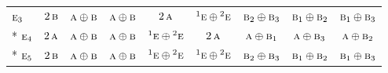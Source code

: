 \documentclass[10pt,a4paper]{article}
\numberwithin{equation}{section}
\newcommand{\irr}[1]{\text{\normalfont\scshape #1}}
\newcommand{\conjpair}[1]{{}^{#1}}
\begin{document}
{\begin{longtable}{@{}lcccccccc@{}}
$\irr{e}_{3}$ & $2\,\irr{b}$ & $\irr{a}\oplus \irr{b}$ & $\irr{a}\oplus \irr{b}$ & $2\,\irr{a}$ & $\conjpair{1}\irr{e}\oplus \conjpair{2}\irr{e}$ & $\irr{b}_{2}\oplus \irr{b}_{3}$ & $\irr{b}_{1}\oplus \irr{b}_{2}$ & $\irr{b}_{1}\oplus \irr{b}_{3}$\\*
$\irr{e}_{4}$ & $2\,\irr{a}$ & $\irr{a}\oplus \irr{b}$ & $\irr{a}\oplus \irr{b}$ & $\conjpair{1}\irr{e}\oplus \conjpair{2}\irr{e}$ & $2\,\irr{a}$ & $\irr{a}\oplus \irr{b}_{1}$ & $\irr{a}\oplus \irr{b}_{3}$ & $\irr{a}\oplus \irr{b}_{2}$\\*
$\irr{e}_{5}$ & $2\,\irr{b}$ & $\irr{a}\oplus \irr{b}$ & $\irr{a}\oplus \irr{b}$ & $\conjpair{1}\irr{e}\oplus \conjpair{2}\irr{e}$ & $\conjpair{1}\irr{e}\oplus \conjpair{2}\irr{e}$ & $\irr{b}_{2}\oplus \irr{b}_{3}$ & $\irr{b}_{1}\oplus \irr{b}_{2}$ & $\irr{b}_{1}\oplus \irr{b}_{3}$\\
\bottomrule\end{longtable}}
\end{document}
